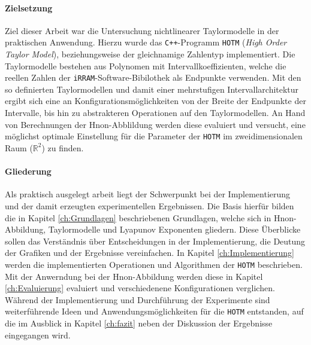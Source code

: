 \paragraph{Zielsetzung}

Ziel dieser Arbeit war die Untersuchung nichtlinearer Taylormodelle in der praktischen Anwendung. Hierzu wurde das \verb.C++.-Programm \verb+HOTM+ (\textit{High Order Taylor Model}), beziehungsweise der gleichnamige Zahlentyp implementiert. Die Taylormodelle bestehen aus Polynomen mit Intervallkoeffizienten, welche die reellen Zahlen der \verb+iRRAM+-Software-Bibilothek als Endpunkte verwenden. Mit den so definierten Taylormodellen und damit einer mehrstufigen Intervallarchitektur ergibt sich eine an Konfigurationsmöglichkeiten von der Breite der Endpunkte der Intervalle, bis hin zu abstrakteren Operationen auf den Taylormodellen. An Hand von Berechnungen der H\e non-Abblildung werden diese evaluiert und versucht, eine möglichst optimale Einstellung für die Parameter der \verb+HOTM+ im zweidimensionalen Raum ($\mathbb{R}^2$) zu finden.

\paragraph{Gliederung}

Als praktisch ausgelegt arbeit liegt der Schwerpunkt bei der Implementierung und der damit erzeugten experimentellen Ergebnissen. Die Basis hierfür bilden die in Kapitel \ref{ch:Grundlagen} beschriebenen Grundlagen, welche sich in H\e non-Abbildung, Taylormodelle und Lyapunov Exponenten gliedern. Diese Überblicke sollen das Verständnis über Entscheidungen in der Implementierung, die Deutung der Grafiken und der Ergebnisse vereinfachen. In Kapitel \ref{ch:Implementierung} werden die implementierten Operationen und Algorithmen der \verb+HOTM+ beschrieben. Mit der Anwerndung bei der H\e non-Abbildung werden diese in Kapitel \ref{ch:Evaluierung} evaluiert und verschiedenene Konfigurationen verglichen. Während der Implementierung und Durchführung der Experimente sind weiterführende Ideen und Anwendungsmöglichkeiten für die \verb+HOTM+ entstanden, auf die im Ausblick in Kapitel \ref{ch:fazit} neben der Diskussion der Ergebnisse eingegangen wird.

